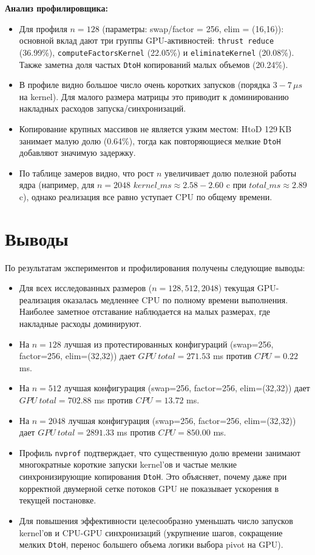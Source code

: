 \documentclass[a4paper,14pt]{extarticle}
\begin{document}
\textbf{Анализ профилировщика:}
\begin{itemize}
    \item Для профиля \(n=128\) (параметры: swap/factor = 256,
    elim = (16,16)):
    основной вклад дают три группы GPU-активностей:
    \texttt{thrust reduce} (36.99\%), \texttt{computeFactorsKernel} (22.05\%)
    и \texttt{eliminateKernel} (20.08\%).
    Также заметна доля частых \texttt{DtoH} копирований
    малых объемов (20.24\%).
    \item В профиле видно большое число очень коротких запусков
    (порядка \(3\!-\!7\)\,\(\mu s\) на kernel). Для малого размера матрицы это
    приводит к доминированию накладных расходов запуска/синхронизаций.
    \item Копирование крупных массивов не является узким местом:
    HtoD 129\,KB занимает малую долю (0.64\%),
    тогда как
    повторяющиеся мелкие \texttt{DtoH} добавляют значимую задержку.
    \item По таблице замеров видно, что рост \(n\) увеличивает долю полезной
    работы ядра (например, для \(n=2048\) \(kernel\_ms \approx 2.58\!-\!2.60\) c
    при \(total\_ms \approx 2.89\) c), однако реализация все равно уступает CPU
    по общему времени.
\end{itemize}

\section*{Выводы}
По результатам экспериментов и профилирования получены следующие выводы:
\begin{itemize}
    \item Для всех исследованных размеров (\(n=128,512,2048\)) текущая
    GPU-реализация оказалась медленнее CPU по полному времени выполнения.
    Наиболее заметное отставание наблюдается на малых размерах, где
    накладные расходы доминируют.
    \item На \(n=128\) лучшая из протестированных конфигураций
    (swap=256, factor=256, elim=(32,32)) дает
    \(GPU\ total=271.53\) ms против \(CPU=0.22\) ms.
    \item На \(n=512\) лучшая конфигурация
    (swap=256, factor=256,
    elim=(32,32)) дает
    \(GPU\ total=702.88\) ms против \(CPU=13.72\) ms.
    \item На \(n=2048\) лучшая конфигурация
    (swap=256, factor=256,
    elim=(32,32)) дает
    \(GPU\ total=2891.33\) ms против \(CPU=850.00\) ms.
    \item Профиль \texttt{nvprof} подтверждает, что существенную долю времени
    занимают многократные короткие запуски kernel'ов и частые мелкие
    синхронизирующие копирования \texttt{DtoH}. Это объясняет, почему даже при
    корректной двумерной сетке потоков GPU не показывает ускорения в текущей
    постановке.
    \item Для повышения эффективности целесообразно уменьшать число запусков
    kernel'ов и CPU-GPU синхронизаций (укрупнение шагов, сокращение мелких
    \texttt{DtoH}, перенос большего объема логики выбора pivot на GPU).
\end{itemize}
\end{document}
